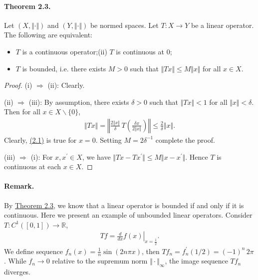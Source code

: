 \documentclass{article}
\begin{document}
\paragraph{Theorem 2.3.\label{thm:2.3}} Let $(X,\Vert\cdot\Vert)$ and $(Y,\Vert\cdot\Vert)$ be normed spaces. Let $T:X\to Y$ be a linear operator. The following are equivalent:
\begin{itemize}
	\item[(i)] $T$ is a continuous operator;\quad (ii) $T$ is continuous at $0$;
	\item[(iii)] $T$ is bounded, i.e. there exists $M>0$ such that $\Vert Tx\Vert\leq M\Vert x\Vert$ for all $x\in X$.
\end{itemize}
\begin{proof}
(i) $\Rightarrow$ (ii): Clearly.
\vspace{0.1cm}

(ii) $\Rightarrow$ (iii): By assumption, there exists $\delta>0$ such that $\Vert Tx\Vert < 1$ for all $\Vert x\Vert <\delta$. Then for all $x\in X\backslash\{0\}$,
\begin{align*}
	\Vert Tx\Vert = \left\Vert\frac{2\Vert x\Vert}{\delta}\,T\left(\frac{\delta x}{2\Vert x\Vert}\right)\right\Vert\leq  \frac{2}{\delta}\Vert x\Vert.\tag{2.1}\label{eq:2.1}
\end{align*}
Clearly, \hyperref[eq:2.1]{(2.1)} is true for $x=0$. Setting $M=2\delta^{-1}$ complete the proof.
\vspace{0.1cm}

(iii) $\Rightarrow$ (i): For $x,x^\prime\in X$, we have $\Vert Tx-Tx^\prime\Vert\leq M\Vert x-x^\prime\Vert$. Hence $T$ is continuous at each $x\in X$.
\end{proof}
\paragraph{Remark.} By \hyperref[thm:2.3]{Theorem 2.3}, we know that a linear operator is bounded if and only if it is continuous. Here we present an example of unbounded linear operators. Consider $T:C^1([0,1])\to\mathbb{R}$,
\begin{align*}
	Tf = \left.\frac{d}{dx}f(x)\right|_{x=\frac{1}{2}}.
\end{align*}
We define sequence $f_n(x)=\frac{1}{n}\sin(2n\pi x)$, then $Tf_n = f_n^\prime(1/2) = (-1)^n\,2\pi$. While $f_n\to 0$ relative to the supremum norm $\Vert\cdot\Vert_\infty$, the image sequence $Tf_n$ diverges.
\end{document}
